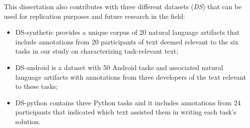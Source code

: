 







    



This dissertation also contributes with three different datasets ({\small \textit{DS}}) that can be used for replication purposes and future research in the field:
    
\begin{itemize}
    \item \acs{DS-synthetic} provides a unique corpus of 20 natural language artifacts that include annotations from 20 participants of text deemed relevant to 
    the six tasks in our study on characterizing task-relevant text;
    
    \item \acs{DS-android} is a dataset with 50 Android tasks     
    and associated natural language artifacts 
    with annotations from three developers of the text relevant to these tasks;

    \item \acs{DS-python} contains three Python tasks and it includes annotations from 24 participants that indicated which
    text assisted them in writing each task's solution.
\end{itemize}